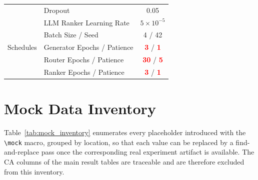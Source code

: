 \documentclass[journal]{IEEEtran}
\newcommand{\mock}[1]{\textbf{\textcolor{red}{#1}}}
\begin{document}
\begin{table}[!t]
{\begin{tabular}{llc}
& Dropout & 0.05 \\
& LLM Ranker Learning Rate & $5\times 10^{-5}$ \\
& Batch Size / Seed & 4 / 42 \\ \midrule
Schedules & Generator Epochs / Patience & \mock{3} / \mock{1} \\
& Router Epochs / Patience & \mock{30} / \mock{5} \\
& Ranker Epochs / Patience & \mock{3} / \mock{1} \\ \bottomrule
\end{tabular}%
}
\end{table}

\section{Mock Data Inventory}
\label{app:mock_inventory}

Table~\ref{tab:mock_inventory} enumerates every placeholder introduced with the
\texttt{\textbackslash mock} macro, grouped by location, so that each value can
be replaced by a find-and-replace pass once the corresponding real experiment
artifact is available. The CA columns of the main result tables are traceable
and are therefore excluded from this inventory.
\end{document}
